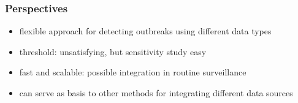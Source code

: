 \documentclass[Xcolor=svgnames,mathserif]{beamer}
\begin{document}
\begin{frame}[fragile]
\begin{center}
rabiesresults}}
\end{center}


\end{frame}






\begin{frame}[fragile]
  \frametitle{Perspectives}

  \begin{itemize}
  \item \alert{flexible} approach for detecting outbreaks using different data types
    \pause
    \vspace{.25cm}
  \item \alert{threshold}: unsatisfying, but sensitivity study easy
    \pause
    \vspace{.25cm}
  \item \alert{fast and scalable}: possible integration in routine surveillance
    \pause
    \vspace{.25cm}
  \item can serve as basis to other methods for integrating different data sources
 \end{itemize}

\end{frame}
\end{document}
